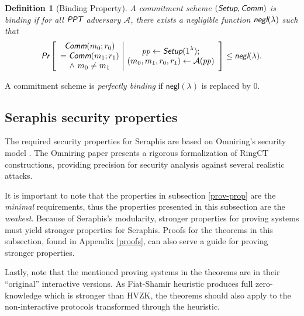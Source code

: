 \documentclass{article}
\newtheorem{definition}{Definition}[section]
\begin{document}
\begin{definition}[Binding Property]
A commitment scheme $(\emph{\textsf{Setup}}, \emph{\textsf{Comm}})$ is binding if for all $\emph{\textsf{PPT}}$ adversary $\mathcal{A}$, there exists a negligible function $\emph{\textsf{negl}}(\lambda)$ such that
\begin{align*}
\emph{\textsf{Pr}}
\left[
\begin{array}{c|c}
    \begin{gathered}
         \emph{\textsf{Comm}}(m_0;r_0) \\
        = \emph{\textsf{Comm}}(m_1;r_1) \\
        \wedge\ m_0 \ne m_1
    \end{gathered}
    &
    \begin{gathered}
        pp\leftarrow\emph{\textsf{Setup}}(1^{\lambda}); \\
        (m_0,m_1,r_0,r_1)\leftarrow\mathcal{A}(pp)
    \end{gathered}
\end{array}
\right]
\le \emph{\textsf{negl}}(\lambda).
\end{align*}
\end{definition}
A commitment scheme is \textit{perfectly binding} if $\textsf{negl}(\lambda)$ is replaced by $0$.

\subsection{Seraphis security properties}\label{sec-thm}
The required security properties for Seraphis are based on Omniring's security model \cite{omniring}. The Omniring paper presents a rigorous formalization of RingCT constructions, providing precision for security analysis against several realistic attacks.

It is important to note that the properties in subsection \ref{prov-prop} are the \textit{minimal} requirements, thus the properties presented in this subsection are the \textit{weakest}. Because of Seraphis's modularity, stronger properties for proving systems must yield stronger properties for Seraphis. Proofs for the theorems in this subsection, found in Appendix \ref{proofs}, can also serve a guide for proving stronger properties.

Lastly, note that the mentioned proving systems in the theorems are in their ``original'' interactive versions. As Fiat-Shamir heuristic produces full zero-knowledge which is stronger than HVZK, the theorems should also apply to the non-interactive protocols transformed through the heuristic.
\end{document}

